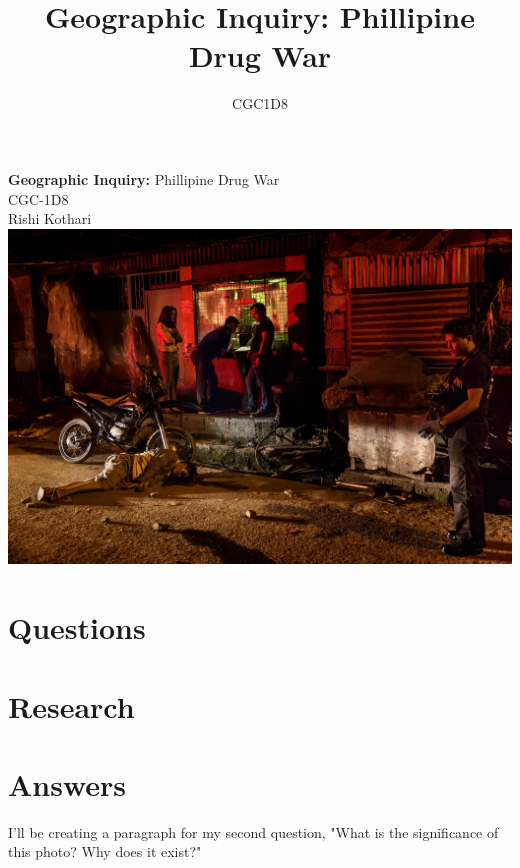 \documentclass[titlepic]{report}
\title{\Huge \textbf{Geographic Inquiry: } Phillipine Drug War}
\date{CGC1D8}
\begin{document}
\begin{titlepage}
    \centering
    \vfill
    {\Huge
     \textbf{Geographic Inquiry: } Phillipine Drug War\\
     \vskip0.5cm
     \Large CGC-1D8\\
        \vskip0.5cm
        Rishi Kothari\\
    }    
    \vskip1cm
    \includegraphics[width=\columnwidth]{graphics/philliphine-drug-war-1.jpg} %
    \vfill
    \vfill
\end{titlepage}

\newpage

\tableofcontents
\newpage


\chapter{Questions}


\chapter{Research}


\chapter{Answers}
I'll be creating a paragraph for my second question, "What is the significance of this photo? Why does it exist?"

\end{document}
